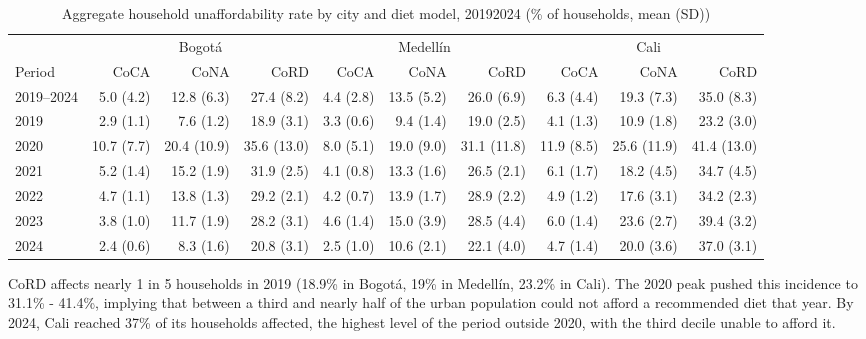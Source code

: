 \documentclass[Afour, sageh,times]{sagej}
\begin{document}
\begin{table}[htbp]
\centering
\begingroup
\fontsize{7}{8}\selectfont
\setlength{\tabcolsep}{2pt}
\renewcommand{\arraystretch}{0.95}
\caption{Aggregate household unaffordability rate by city and diet model, 2019\textendash{}2024 (\% of households, mean (SD))}
\label{tab:afford_annual}
\begin{tabular}{lrrrrrrrrr}
\toprule
 & \multicolumn{3}{c}{Bogotá} & \multicolumn{3}{c}{Medellín} & \multicolumn{3}{c}{Cali} \\
\cmidrule(lr){2-4}\cmidrule(lr){5-7}\cmidrule(lr){8-10}
Period & CoCA & CoNA & CoRD & CoCA & CoNA & CoRD & CoCA & CoNA & CoRD \\
\midrule
2019–2024 & 5.0 (4.2) & 12.8 (6.3) & 27.4 (8.2) & 4.4 (2.8) & 13.5 (5.2) & 26.0 (6.9) & 6.3 (4.4) & 19.3 (7.3) & 35.0 (8.3) \\
2019       & 2.9 (1.1)  & 7.6 (1.2)   & 18.9 (3.1) & 3.3 (0.6) & 9.4 (1.4)   & 19.0 (2.5) & 4.1 (1.3) & 10.9 (1.8) & 23.2 (3.0) \\
2020       & 10.7 (7.7) & 20.4 (10.9) & 35.6 (13.0) & 8.0 (5.1) & 19.0 (9.0) & 31.1 (11.8) & 11.9 (8.5) & 25.6 (11.9) & 41.4 (13.0) \\
2021       & 5.2 (1.4)  & 15.2 (1.9)  & 31.9 (2.5) & 4.1 (0.8) & 13.3 (1.6)  & 26.5 (2.1) & 6.1 (1.7) & 18.2 (4.5)  & 34.7 (4.5) \\
2022       & 4.7 (1.1)  & 13.8 (1.3)  & 29.2 (2.1) & 4.2 (0.7) & 13.9 (1.7)  & 28.9 (2.2) & 4.9 (1.2) & 17.6 (3.1)  & 34.2 (2.3) \\
2023       & 3.8 (1.0)  & 11.7 (1.9)  & 28.2 (3.1) & 4.6 (1.4) & 15.0 (3.9)  & 28.5 (4.4) & 6.0 (1.4) & 23.6 (2.7)  & 39.4 (3.2) \\
2024       & 2.4 (0.6)  & 8.3 (1.6)   & 20.8 (3.1) & 2.5 (1.0) & 10.6 (2.1)  & 22.1 (4.0) & 4.7 (1.4) & 20.0 (3.6)  & 37.0 (3.1) \\
\bottomrule
\end{tabular}
\vspace{0.5em}
\endgroup
\end{table}

CoRD affects nearly 1 in 5 households in 2019 (18.9\% in Bogotá, 19\% in Medellín, 23.2\% in Cali). The 2020 peak pushed this incidence to 31.1\% - 41.4\%, implying that between a third and nearly half of the urban population could not afford a recommended diet that year. By 2024, Cali reached 37\% of its households affected, the highest level of the period outside 2020, with the third decile unable to afford it.
\end{document}
